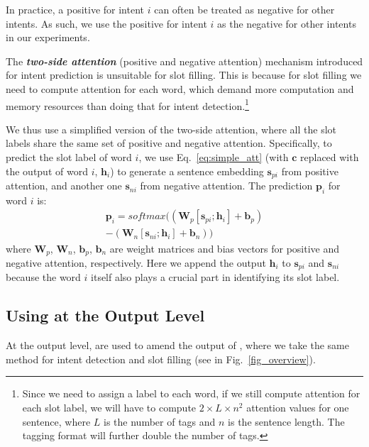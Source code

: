 In practice, a positive \RE for intent $i$ can often be treated as negative \REs for other intents. As such, we use the positive \REs for
intent $i$ as the negative \REs for other intents in our experiments.

The \textbf{\emph{two-side attention}} (positive and negative attention) mechanism introduced for intent prediction is unsuitable for slot
filling. This is because for slot filling we need to compute attention for each word, which demand more computation
and memory resources than doing that for intent detection.\footnote{Since we need to assign a label to each word, if we still compute
attention for each slot label, we will have to compute $2\times L \times n^2$ attention values for one sentence, where $L$ is the number of
tags and $n$ is the sentence length. The \BIO tagging format will further double the number of tags.}

We thus use a simplified version of the two-side attention, where all the slot labels share the same set of positive and negative attention.
Specifically, to predict the slot label of word $i$, we use Eq.~\ref{eq:simple_att} (with $\textbf{c}$ replaced with the \BLSTM output of word $i$, $\textbf{h}_i$) to generate a sentence embedding $\textbf{s}_{pi}$ from positive attention, and another one $\textbf{s}_{ni}$ from negative attention.
The prediction $\textbf{p}_i$ for word $i$ is:
\begin{equation}
\begin{split}
\textbf{p}_i = softmax((\textbf{W}_p [\textbf{s}_{pi}; \textbf{h}_i] + \textbf{b}_p) \\- (\textbf{W}_n [\textbf{s}_{ni}; \textbf{h}_i] + \textbf{b}_n))
\end{split}
\end{equation}
where $\textbf{W}_{p}$, $\textbf{W}_{n}$, $\textbf{b}_{p}$, $\textbf{b}_{n}$ are weight matrices and bias vectors for positive and negative attention, respectively. Here we append the \BLSTM output $\textbf{h}_i$ to $\textbf{s}_{pi}$ and $\textbf{s}_{ni}$ because the word $i$ itself also plays a crucial part in identifying its slot label.

\subsection{Using \REs at the Output Level}
\label{fusion_with_output} At the output level, \REs are used to amend the output of \NNs, where we take the same method for intent
detection and slot filling (see  in Fig.~\ref{fig_overview}).

